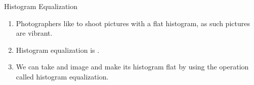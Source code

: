 \begin{frame}{Histogram Equalization}
    \begin{enumerate}
      \item Photographers like to shoot pictures with a flat histogram, as such pictures are vibrant.

      \item Histogram equalization is .

      \item We can take and image and make its histogram flat by using the operation called histogram equalization.

    \end{enumerate}
\end{frame}

